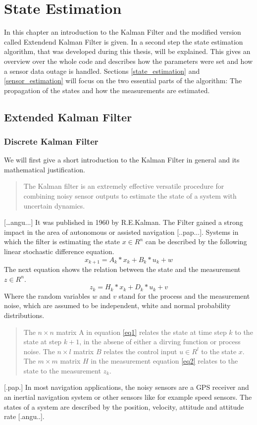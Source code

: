 \chapter{State Estimation}\label{cha3}
In this chapter an introduction to the Kalman Filter and the modified version called Extendend Kalman Filter is given. In a second step  the state estimation algorithm, that was developed during this thesis, will be explained. This gives an overview over the whole code and describes how the parameters were set and how a sensor data outage is handled. Sections \ref{state_estimation} and \ref{sensor_estimation} will focus on the two essential parts of the algorithm: The propagation of the states and how the measurements are estimated.


\section{Extended Kalman Filter}

\subsection*{Discrete Kalman Filter}
We will first give a short introduction to the Kalman Filter in general and its mathematical justification.
\begin{quote}The Kalman filter is an extremely effective versatile procedure for combining noisy sensor outputs to estimate the state of a system with uncertain dynamics.\end{quote} […angu...] It was published in 1960 by R.E.Kalman. The Filter gained a strong impact in the area of autonomous or assisted navigation [..pap...]. 
Systems in which the filter is estimating the state $x \in R^{n}$ can be described by the following linear stochastic difference equation.
\begin{equation}
x_{k+1}=A_k*x_k+B_k*u_k+w
\label{eq1}
\end{equation} The next equation shows the relation between the state and the measurement $z \in R^{n}$.
\begin{equation} 
z_k=H_k*x_k+D_k*u_k+v
\label{eq2}
\end{equation}
Where the random variables $w$ and $v$ stand for the process and the measurement noise, which are assumed to be independent, white and normal probability distributions.
\begin{quote}The $n\times n$ matrix A in equation \ref{eq1} relates the state at time step $k$ to the state at step $k+1$, in the absene of either a dirving function or process noise. The $n\times l$ matrix $B$ relates the control input $u \in R^{l}$ to the state $x$. The $m \times m$ matrix $H$ in the measurement equation \ref{eq2} relates to the state to the measurement $z_k$.\end{quote}[.pap.]
In most navigation applications, the noisy sensors are a GPS receiver and an inertial navigation system or other sensors like for example speed sensors. The states of a system are described by the position, velocity, attitude and attitude rate [.angu..].

